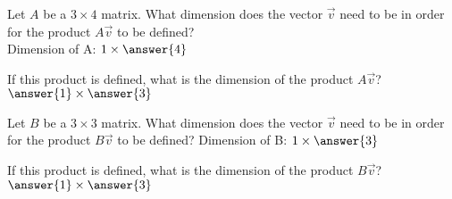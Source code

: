\documentclass{ximera}
\begin{document}
\begin{exercise}
    Let $A$ be a $3 \times 4$ matrix. What dimension does the vector $\vec{v}$ need to be in order for the product $A\vec{v}$ to be defined? \\
    Dimension of A: $1\times\answer{4}$
    \begin{problem}
        If this product is defined, what is the dimension of the product $A\vec{v}$? $\answer{1}\times\answer{3}$
    \end{problem}
\end{exercise}
\begin{exercise}
    Let $B$ be a $3 \times 3$ matrix. What dimension does the vector $\vec{v}$ need to be in order for the product $B\vec{v}$ to be defined? 
    Dimension of B: $1\times\answer{3}$
    \begin{problem}
        If this product is defined, what is the dimension of the product $B\vec{v}$? $\answer{1}\times\answer{3}$
    \end{problem}
\end{exercise}

%
\end{document}
